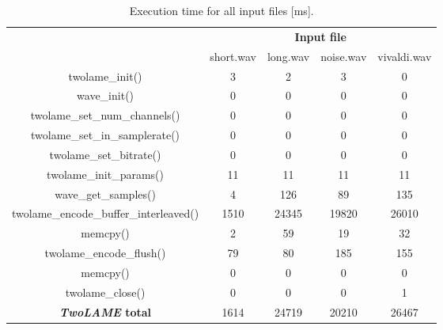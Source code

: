 \begin{table}[H]
    \centering
    \begin{tabular}{c|c|c|c|c|}
    \cline{2-5}
    \multicolumn{1}{c|}{}  & \multicolumn{4}{c|}{\textbf{Input file}} \\
    \cline{2-5}
     & short.wav & long.wav & noise.wav & vivaldi.wav \\
    \hline
    \multicolumn{1}{|c|}{twolame\_init()}  & 3 & 2 & 3 & 0 \\ 
    \hline
    \multicolumn{1}{|c|}{wave\_init()}  & 0 & 0 & 0 & 0 \\ 
    \hline
    \multicolumn{1}{|c|}{twolame\_set\_num\_channels()}   & 0 & 0 & 0 & 0 \\ 
    \hline
    \multicolumn{1}{|c|}{twolame\_set\_in\_samplerate()}   & 0 & 0 & 0 & 0 \\ 
    \hline
    \multicolumn{1}{|c|}{twolame\_set\_bitrate()}   & 0 & 0 & 0 & 0 \\ 
    \hline
    \multicolumn{1}{|c|}{twolame\_init\_params()}   & 11 & 11 & 11 & 11 \\ 
    \hline
    \multicolumn{1}{|c|}{wave\_get\_samples()}   & 4 & 126 & 89 & 135 \\ 
    \hline
    \multicolumn{1}{|c|}{twolame\_encode\_buffer\_interleaved()}   & 1510 & 24345 & 19820 & 26010 \\ 
    \hline
    \multicolumn{1}{|c|}{memcpy()}  & 2 & 59 & 19 & 32 \\ 
    \hline
    \multicolumn{1}{|c|}{twolame\_encode\_flush()}   & 79 & 80 & 185 & 155 \\ 
    \hline
    \multicolumn{1}{|c|}{memcpy()}  & 0 & 0 & 0 & 0 \\ 
    \hline
    \multicolumn{1}{|c|}{twolame\_close()}   & 0 & 0 & 0 & 1 \\ 
    \hline
    \multicolumn{1}{|c|}{\textbf{\textit{TwoLAME} total}}  & 1614 & 24719 & 20210 & 26467 \\ 
    \hline
    \end{tabular}
    \caption{Execution time for all input files [ms].}
    \label{profiling1}
\end{table}

\vspace{1cm}


